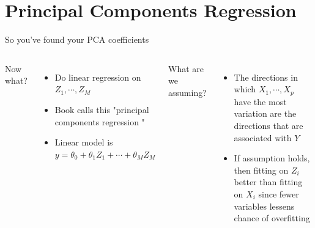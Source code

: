 \documentclass[aspectratio=169,usenames,dvipsnames]{beamer}
\newcommand{\InstructorList}[1]{
\begin{itemize}
	\color{orange}
	#1
\end{itemize}
}
\begin{document}
\section{Principal Components Regression }

\begin{frame}[t]{So you've found your PCA coefficients}

\begin{columns}
\centering
Now what?

\InstructorList{
\item Do linear regression on $Z_1,\cdots,Z_M$
\item Book calls this "principal components regression "
\item Linear model is $y = \theta_0 + \theta_1 Z_1 + \cdots + \theta_M Z_M$
}
\centering
What are we assuming?

\InstructorList{
\item The directions in which $X_1,\cdots, X_p$ have the most variation are the directions that are associated with $Y$
\item If assumption holds, then fitting on $Z_i$ better than fitting on $X_i$ since fewer variables lessens chance of overfitting
}

\end{columns}

\end{frame}
\end{document}
